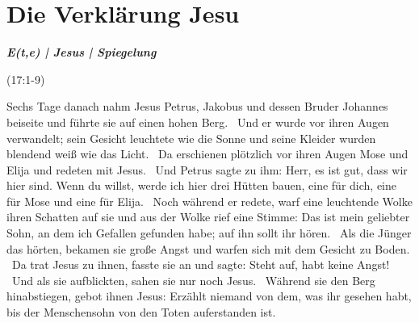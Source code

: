 \newpage
\section{Die Verklärung Jesu}

\textbf{\textit{E(t,e) | Jesus | Spiegelung}}

(17:1-9)
\begin{BibelSt}
Sechs Tage danach nahm Jesus Petrus, Jakobus und dessen Bruder Johannes beiseite und führte sie auf einen hohen Berg.  Und er wurde vor ihren Augen verwandelt; sein Gesicht leuchtete wie die Sonne und seine Kleider wurden blendend weiß wie das Licht.  Da erschienen plötzlich vor ihren Augen Mose und Elija und redeten mit Jesus.  Und Petrus sagte zu ihm: Herr, es ist gut, dass wir hier sind. Wenn du willst, werde ich hier drei Hütten bauen, eine für dich, eine für Mose und eine für Elija.  Noch während er redete, warf eine leuchtende Wolke ihren Schatten auf sie und aus der Wolke rief eine Stimme: Das ist mein geliebter Sohn, an dem ich Gefallen gefunden habe; auf ihn sollt ihr hören.  Als die Jünger das hörten, bekamen sie große Angst und warfen sich mit dem Gesicht zu Boden.  Da trat Jesus zu ihnen, fasste sie an und sagte: Steht auf, habt keine Angst!  Und als sie aufblickten, sahen sie nur noch Jesus.  Während sie den Berg hinabstiegen, gebot ihnen Jesus: Erzählt niemand von dem, was ihr gesehen habt, bis der Menschensohn von den Toten auferstanden ist.
\end{BibelSt}

